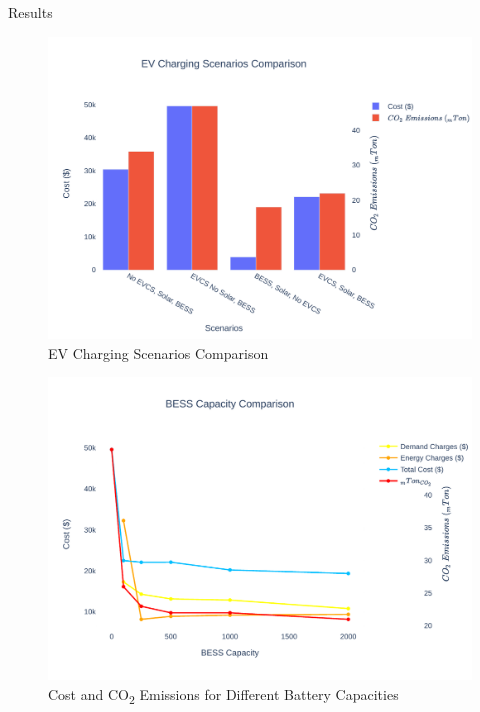 \documentclass[final, 20 pt]{beamer}
\newlength{\onecolwid}
\begin{document}
\begin{frame}[t]
\begin{columns}[t]
\begin{column}{\onecolwid}
\begin{block}{Results}

	\begin{figure}[!htb]
			\centering
			\includegraphics[width=\linewidth]{Fig/mg_scene_comparison}
			\caption{\footnotesize EV Charging Scenarios Comparison}
			\label{fig:mgscenecomparison}
	\end{figure}
	
	\begin{figure}[!htb] 		
		\includegraphics[width=\linewidth]{Fig/bess_capacity_comparison}
		\caption{\footnotesize Cost and CO\textsubscript{2} Emissions for Different Battery Capacities}
		\label{fig:besscapacitycomparison}		
	\end{figure}


\end{block}
\end{column}
\end{columns}
\end{frame}
\end{document}
